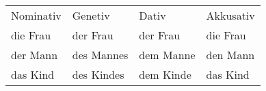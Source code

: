 \begin{sidewaystable}
   \begin{tabular}{@{}*{4}{l}@{}}
         Nominativ & Genetiv & Dativ & Akkusativ \\
         die Frau & der Frau & der Frau & die Frau \\
         der Mann & des Mannes & dem Manne & den Mann \\
         das Kind & des Kindes & dem Kinde & das Kind \\
   \end{tabular}
\end{sidewaystable}